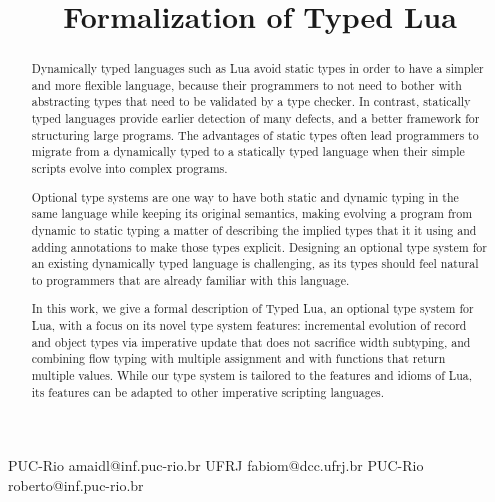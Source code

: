 \documentclass{sigplanconf}
\begin{document}
\setlength{\pdfpageheight}{\paperheight}
\setlength{\pdfpagewidth}{\paperwidth}



\title{Formalization of Typed Lua}

           {PUC-Rio}
           {amaidl@inf.puc-rio.br}
           {UFRJ}
           {fabiom@dcc.ufrj.br}
           {PUC-Rio}
           {roberto@inf.puc-rio.br}

\maketitle

\begin{abstract}
Dynamically typed languages such as Lua avoid static types in order
to have a simpler and more flexible language, because their programmers
to not need to bother with abstracting types that need to be validated
by a type checker. In contrast, statically typed languages provide
earlier detection of many defects, and a better framework for structuring
large programs. The advantages of static types often lead programmers to
migrate from a dynamically typed to a statically typed language when
their simple scripts evolve into complex programs.

Optional type systems are one way to have both static and dynamic
typing in the same language while keeping its original semantics,
making evolving a program from dynamic to static typing a matter of
describing the implied types that it it using and adding annotations
to make those types explicit. Designing an optional type system for
an existing dynamically typed language is challenging, as its types
should feel natural to programmers that are already familiar with
this language.

In this work, we give a formal description of Typed Lua, an
optional type system for Lua, with a focus on its novel type system
features: incremental evolution of record and object types via
imperative update that does not sacrifice width subtyping,
and combining flow typing with multiple assignment and with functions that
return multiple values. While our type system is tailored to the
features and idioms of Lua, its features can be adapted to other
imperative scripting languages.
\end{abstract}
\end{document}
